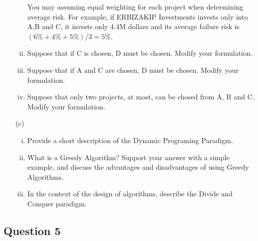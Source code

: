\documentclass[12pt]{article}
\begin{document}
\begin{itemize}
\begin{enumerate}[(i)]
				You may assuming equal weighting for each project when determining average risk. For example, if ERBIZAKIP Investments invests only into A,B and C, it invests
				only 4.4M dollars and its average failure risk is $(6\%+4\% +5\%)/3=5\%$.
				
				\item Suppose that if C is chosen, D must be chosen. Modify your
				formulation.
				\item   Suppose that if A and C are chosen, D must be chosen. Modify your
				formulation.
				\item Suppose that only two projects, at most, can be chosed from A, B and C.  Modify your
				formulation.
			\end{enumerate}
	\newpage
			\item[(c)]
			\begin{enumerate}[(i)]

				
							\item Provide a short description of the Dynamic Programing Paradigm.  
							\item What is a Greedy Algorithm? Support your answer with a simple example, and discuss the advantages and disadvantages of using Greedy Algorithms.   															
								\item In the context of the design of algorithms, describe the Divide and Conquer paradigm. 
			\end{enumerate}

		\end{itemize}
		
		\subsection*{Question 5}
		
		
\end{document}
